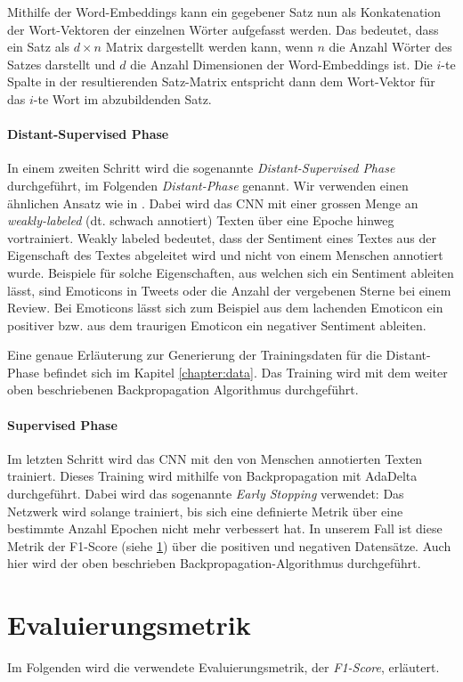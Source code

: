 Mithilfe der Word-Embeddings kann ein gegebener Satz nun als Konkatenation der Wort-Vektoren der einzelnen Wörter aufgefasst werden. Das bedeutet, dass ein Satz als $d \times n$ Matrix dargestellt werden kann, wenn $n$ die Anzahl Wörter des Satzes darstellt und $d$ die Anzahl Dimensionen der Word-Embeddings ist. Die $i$-te Spalte in der resultierenden Satz-Matrix entspricht dann dem Wort-Vektor für das $i$-te Wort im abzubildenden Satz.

\paragraph{Distant-Supervised Phase} In einem zweiten Schritt wird die sogenannte \emph{Distant-Super\-vised Phase} durchgeführt, im Folgenden \emph{Distant-Phase} genannt. Wir verwenden einen ähnlichen Ansatz wie in \cite{Go:2009}. Dabei wird das CNN mit einer grossen Menge an \emph{weakly-labeled} (dt. schwach annotiert) Texten über eine Epoche hinweg vortrainiert. Weakly labeled bedeutet, dass der Sentiment eines Textes aus der Eigenschaft des Textes abgeleitet wird und nicht von einem Menschen annotiert wurde. Beispiele für solche Eigenschaften, aus welchen sich ein Sentiment ableiten lässt, sind Emoticons in Tweets oder die Anzahl der vergebenen Sterne bei einem Review. Bei Emoticons lässt sich zum Beispiel aus dem lachenden Emoticon \quotes{:-)} ein positiver bzw. aus dem traurigen Emoticon \quotes{:-(} ein negativer Sentiment ableiten.

Eine genaue Erläuterung zur Generierung der Trainingsdaten für die Distant-Phase befindet sich im Kapitel \ref{chapter:data}. Das Training wird mit dem weiter oben beschriebenen Backpropagation Algorithmus durchgeführt.

\paragraph{Supervised Phase} Im letzten Schritt wird das CNN mit den von Menschen annotierten Texten trainiert. Dieses Training wird mithilfe von Backpropagation mit AdaDelta durchgeführt. Dabei wird das sogenannte \emph{Early Stopping} verwendet: Das Netzwerk wird solange trainiert, bis sich eine definierte Metrik über eine bestimmte Anzahl Epochen nicht mehr verbessert hat. In unserem Fall ist diese Metrik der F1-Score (siehe \ref{sec:metric}) über die positiven und negativen Datensätze. Auch hier wird der oben beschrieben Backpropagation-Algorithmus durchgeführt.

\section{Evaluierungsmetrik}\label{sec:metric}
Im Folgenden wird die verwendete Evaluierungsmetrik, der \emph{F1-Score}, erläutert.

